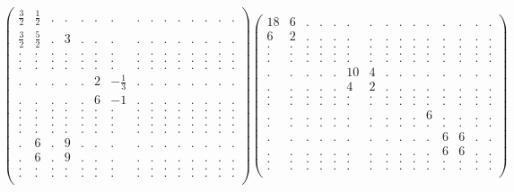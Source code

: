 \documentclass[12pt,a4paper]{amsart}
\begin{document}
\begin{align*}
\left(\begin{array}{rrrrrrrrrrrrrrr}%
\frac32&\frac12&.&.&.&.&.&.&.&.&.&.&.&.&.\\%
\frac32&\frac{5}{2}&.&3&.&.&.&.&.&.&.&.&.&.&.\\%
.&.&.&.&.&.&.&.&.&.&.&.&.&.&.\\%
.&.&.&.&.&.&.&.&.&.&.&.&.&.&.\\%
.&.&.&.&.&.&.&.&.&.&.&.&.&.&.\\%
.&.&.&.&.&2&-\frac13&.&.&.&.&.&.&.&.\\%
.&.&.&.&.&6&-1&.&.&.&.&.&.&.&.\\%
.&.&.&.&.&.&.&.&.&.&.&.&.&.&.\\%
.&.&.&.&.&.&.&.&.&.&.&.&.&.&.\\%
.&.&.&.&.&.&.&.&.&.&.&.&.&.&.\\%
.&.&.&.&.&.&.&.&.&.&.&.&.&.&.\\%
.&6&.&9&.&.&.&.&.&.&.&.&.&.&.\\%
.&6&.&9&.&.&.&.&.&.&.&.&.&.&.\\%
.&.&.&.&.&.&.&.&.&.&.&.&.&.&.\\%
.&.&.&.&.&.&.&.&.&.&.&.&.&.&.\\%
\end{array}\right)%
\left(\begin{array}{rrrrrrrrrrrrrrr}%
18&6&.&.&.&.&.&.&.&.&.&.&.&.&.\\%
6&2&.&.&.&.&.&.&.&.&.&.&.&.&.\\%
.&.&.&.&.&.&.&.&.&.&.&.&.&.&.\\%
.&.&.&.&.&.&.&.&.&.&.&.&.&.&.\\%
.&.&.&.&.&.&.&.&.&.&.&.&.&.&.\\%
.&.&.&.&.&10&4&.&.&.&.&.&.&.&.\\%
.&.&.&.&.&4&2&.&.&.&.&.&.&.&.\\%
.&.&.&.&.&.&.&.&.&.&.&.&.&.&.\\%
.&.&.&.&.&.&.&.&.&.&.&.&.&.&.\\%
.&.&.&.&.&.&.&.&.&.&6&.&.&.&.\\%
.&.&.&.&.&.&.&.&.&.&.&.&.&.&.\\%
.&.&.&.&.&.&.&.&.&.&.&6&6&.&.\\%
.&.&.&.&.&.&.&.&.&.&.&6&6&.&.\\%
.&.&.&.&.&.&.&.&.&.&.&.&.&.&.\\%
.&.&.&.&.&.&.&.&.&.&.&.&.&.&.\\%
\end{array}\right)%
\end{align*}
\end{document}
